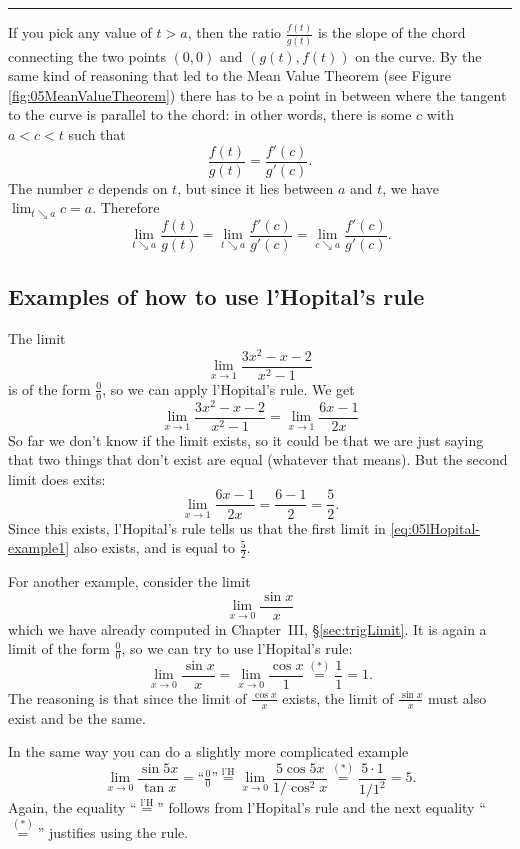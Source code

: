 \noindent\rule{\textwidth}{1pt}\smallskip

If you pick any value of $t>a$, then the ratio $\frac{f(t)} {g(t)}$ is the slope
of the chord connecting the two points $(0,0)$ and $(g(t), f(t))$ on the curve.
By the same kind of reasoning that led to the Mean Value Theorem (see Figure
\ref{fig:05MeanValueTheorem}) there has to be a point in between where the
tangent to the curve is parallel to the chord: in other words, there is some $c$
with $a<c<t$ such that
\[
\frac{f(t)} {g(t)} = \frac{f'(c)} {g'(c)}.
\]
The number $c$ depends on $t$, but since it lies between $a$ and $t$, we have
$\lim_{t\searrow a}c = a$.  
Therefore
\[
\lim_{t\searrow a}\frac{f(t)} {g(t)} = \lim_{t\searrow a}\frac{f'(c)} {g'(c)} =
\lim_{c\searrow a}\frac{f'(c)} {g'(c)}.
\]


 
\subsection{Examples of how to use l'Hopital's rule}
The limit 
\[
\lim_{x\to 1} \frac{3x^2-x-2} {x^2-1}
\]
is of the form $\frac{0} {0}$, so we can apply l'Hopital's rule.  We
get
\begin{equation}
\lim_{x\to 1} \frac{3x^2-x-2} {x^2-1}
=
\lim_{x\to 1} \frac{6x-1} {2x}
\label{eq:05lHopital-example1}
\end{equation}
So far we don't know if the limit exists, so it could be that we are
just saying that two things that don't exist are equal (whatever that
means).  But the second limit does exits:
\[
\lim_{x\to 1} \frac{6x-1} {2x} = \frac{6-1} {2} = \frac{5} {2}.
\]
Since this exists, l'Hopital's rule tells us that
the first limit in \eqref{eq:05lHopital-example1} also exists, and is
equal to $\frac52$.

For another example, consider the limit 
\[
\lim_{x\to 0} \frac{\sin x} {x}
\]
which we have already computed in Chapter~III, \S\ref{sec:trigLimit}.  It is again
a limit of the form $\frac00$, so we can try to use l'Hopital's rule:
\[
\lim_{x\to 0} \frac{\sin x} {x} = \lim_{x\to0} \frac{\cos x} {1}
\stackrel{(*)}= \frac{1} {1} =1.
\]
The reasoning is that since the limit of $\frac{\cos x} {x}$ exists,
the limit of $\frac{\sin x}x$ must also exist and be the same.

In the same way you can do a slightly more complicated example
\[
\lim_{x\to 0} \frac{\sin 5x} {\tan x}
=\text{``}\tfrac00\text{''}
\stackrel{\text{l'H}}=
\lim_{x\to0} \frac{5\cos 5x} {1/\cos^2x}
\stackrel{{(*)}}= \frac{5\cdot 1} {1/1^2} = 5.
\]
Again, the equality ``$\stackrel{\text{l'H}}=$''  follows from
l'Hopital's rule and the next equality ``$\stackrel{(*)}=$'' justifies
using the rule.

